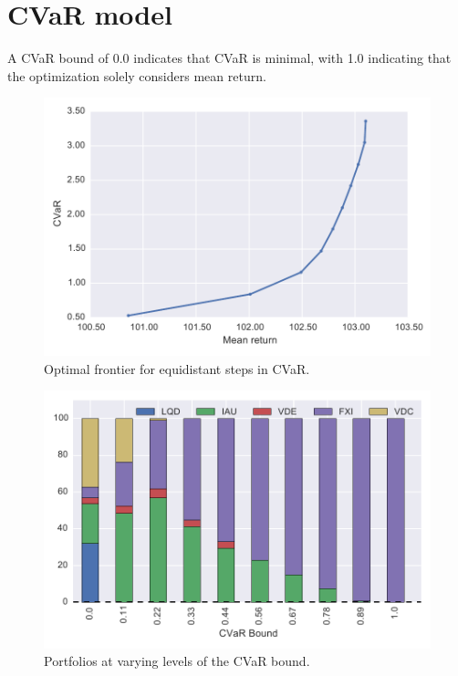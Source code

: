 \section{CVaR model}

A CVaR bound of 0.0 indicates that CVaR is minimal, with 1.0 indicating that the optimization solely considers mean return.


\begin{figure}[tp]
\centering
\includegraphics{../pic/frontier.pdf}
\caption{Optimal frontier for equidistant steps in CVaR.}
\label{fig:scenarioreturn}
\end{figure}

\begin{figure}[tp]
\centering
\includegraphics{../pic/Stake_vs_CVaR.pdf}
\caption{Portfolios at varying levels of the CVaR bound.}
\label{fig:scenarioreturn}
\end{figure}

